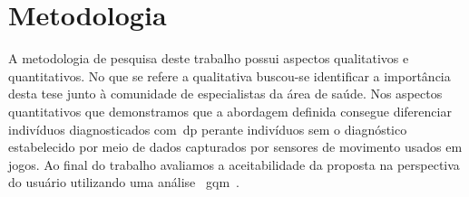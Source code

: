 
\section{Metodologia}
A metodologia de pesquisa deste trabalho possui aspectos qualitativos e quantitativos. No que se refere a qualitativa buscou-se identificar a importância desta tese junto à comunidade de especialistas da área de saúde. Nos aspectos quantitativos que demonstramos que a abordagem definida consegue diferenciar indivíduos diagnosticados com~\ac{dp} perante indivíduos sem o diagnóstico estabelecido por meio de dados capturados por sensores de movimento usados em jogos. Ao final do trabalho avaliamos a aceitabilidade da proposta na perspectiva do usuário utilizando uma análise ~\ac{gqm}~\cite{van1999goal}. %


